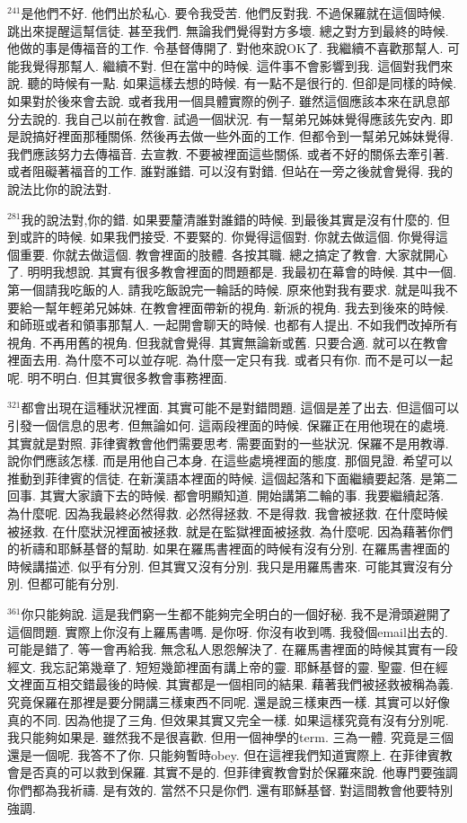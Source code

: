 \documentclass{book}
\begin{document}
$^{241}$是他們不好.
他們出於私心.
要令我受苦.
他們反對我.
不過保羅就在這個時候.
跳出來提醒這幫信徒.
甚至我們.
無論我們覺得對方多壞.
總之對方到最終的時候.
他做的事是傳福音的工作.
令基督傳開了.
對他來說OK了.
我繼續不喜歡那幫人.
可能我覺得那幫人.
繼續不對.
但在當中的時候.
這件事不會影響到我.
這個對我們來說.
聽的時候有一點.
如果這樣去想的時候.
有一點不是很行的.
但卻是同樣的時候.
如果對於後來會去說.
或者我用一個具體實際的例子.
雖然這個應該本來在訊息部分去說的.
我自己以前在教會.
試過一個狀況.
有一幫弟兄姊妹覺得應該先安內.
即是說搞好裡面那種關係.
然後再去做一些外面的工作.
但都令到一幫弟兄姊妹覺得.
我們應該努力去傳福音.
去宣教.
不要被裡面這些關係.
或者不好的關係去牽引著.
或者阻礙著福音的工作.
誰對誰錯.
可以沒有對錯.
但站在一旁之後就會覺得.
我的說法比你的說法對.

$^{281}$我的說法對,你的錯.
如果要釐清誰對誰錯的時候.
到最後其實是沒有什麼的.
但到或許的時候.
如果我們接受.
不要緊的.
你覺得這個對.
你就去做這個.
你覺得這個重要.
你就去做這個.
教會裡面的肢體.
各按其職.
總之搞定了教會.
大家就開心了.
明明我想說.
其實有很多教會裡面的問題都是.
我最初在幕會的時候.
其中一個.
第一個請我吃飯的人.
請我吃飯說完一輪話的時候.
原來他對我有要求.
就是叫我不要給一幫年輕弟兄姊妹.
在教會裡面帶新的視角.
新派的視角.
我去到後來的時候.
和師班或者和領事那幫人.
一起開會聊天的時候.
也都有人提出.
不如我們改掉所有視角.
不再用舊的視角.
但我就會覺得.
其實無論新或舊.
只要合適.
就可以在教會裡面去用.
為什麼不可以並存呢.
為什麼一定只有我.
或者只有你.
而不是可以一起呢.
明不明白.
但其實很多教會事務裡面.

$^{321}$都會出現在這種狀況裡面.
其實可能不是對錯問題.
這個是差了出去.
但這個可以引發一個信息的思考.
但無論如何.
這兩段裡面的時候.
保羅正在用他現在的處境.
其實就是對照.
菲律賓教會他們需要思考.
需要面對的一些狀況.
保羅不是用教導.
說你們應該怎樣.
而是用他自己本身.
在這些處境裡面的態度.
那個見證.
希望可以推動到菲律賓的信徒.
在新漢語本裡面的時候.
這個起落和下面繼續要起落.
是第二回事.
其實大家讀下去的時候.
都會明顯知道.
開始講第二輪的事.
我要繼續起落.
為什麼呢.
因為我最終必然得救.
必然得拯救.
不是得救.
我會被拯救.
在什麼時候被拯救.
在什麼狀況裡面被拯救.
就是在監獄裡面被拯救.
為什麼呢.
因為藉著你們的祈禱和耶穌基督的幫助.
如果在羅馬書裡面的時候有沒有分別.
在羅馬書裡面的時候講描述.
似乎有分別.
但其實又沒有分別.
我只是用羅馬書來.
可能其實沒有分別.
但都可能有分別.

$^{361}$你只能夠說.
這是我們窮一生都不能夠完全明白的一個好秘.
我不是滑頭避開了這個問題.
實際上你沒有上羅馬書嗎.
是你呀.
你沒有收到嗎.
我發個email出去的.
可能是錯了.
等一會再給我.
無念私人恩怨解決了.
在羅馬書裡面的時候其實有一段經文.
我忘記第幾章了.
短短幾節裡面有講上帝的靈.
耶穌基督的靈.
聖靈.
但在經文裡面互相交錯最後的時候.
其實都是一個相同的結果.
藉著我們被拯救被稱為義.
究竟保羅在那裡是要分開講三樣東西不同呢.
還是說三樣東西一樣.
其實可以好像真的不同.
因為他提了三角.
但效果其實又完全一樣.
如果這樣究竟有沒有分別呢.
我只能夠如果是.
雖然我不是很喜歡.
但用一個神學的term.
三為一體.
究竟是三個還是一個呢.
我答不了你.
只能夠暫時obey.
但在這裡我們知道實際上.
在菲律賓教會是否真的可以救到保羅.
其實不是的.
但菲律賓教會對於保羅來說.
他專門要強調你們都為我祈禱.
是有效的.
當然不只是你們.
還有耶穌基督.
對這間教會他要特別強調.
\end{document}
